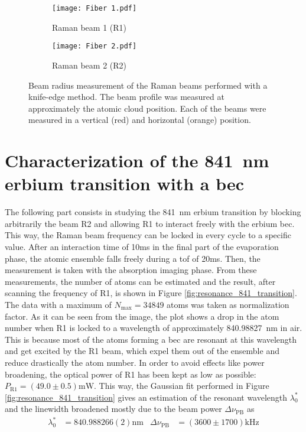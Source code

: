 \pagebreak

\begin{figure}
	\centering
	\begin{subfigure}{.5\textwidth}
		\centering
		\texttt{[image: Fiber 1.pdf]}
		\caption{Raman beam 1 (R1)}
		\label{fig:raman_beams_radius_1}
	\end{subfigure}%
	\begin{subfigure}{.5\textwidth}
		\centering
		\texttt{[image: Fiber 2.pdf]}
		\caption{Raman beam 2 (R2)}
		\label{fig:raman_beams_radius_2}
	\end{subfigure}
	\caption[Beam radius measurement of the Raman beams performed with a knife-edge method]{Beam radius measurement of the Raman beams performed with a knife-edge method. The beam profile was measured at approximately the atomic cloud position. Each of the beams were measured in a vertical (red) and horizontal (orange) position.}
	\label{fig:raman_beams_radius}
\end{figure}


\section{Characterization of the \SI{841}{\nano\meter} erbium transition with a \ac{bec}}

The following part consists in studying the \SI{841}{\nano\meter} erbium transition by blocking arbitrarily the beam R2 and allowing R1 to interact freely with the erbium \ac{bec}. This way, the Raman beam frequency can be locked in every cycle to a specific value. After an interaction time of 10\si{\milli\second} in the final part of the evaporation phase, the atomic ensemble falls freely during a \ac{tof} of 20\si{\milli\second}. Then, the measurement is taken with the absorption imaging phase. From these measurements, the number of atoms can be estimated and the result, after scanning the frequency of R1, is shown in Figure \ref{fig:resonance_841_transition}. The data with a maximum of $N_\text{max} = 34849$ atoms was taken as normalization factor. As it can be seen from the image, the plot shows a drop in the atom number when R1 is locked to a wavelength of approximately \SI{840.98827}{\nano\meter} in air. This is because most of the atoms forming a \ac{bec} are resonant at this wavelength and get excited by the R1 beam, which expel them out of the ensemble and reduce drastically the atom number. In order to avoid effects like power broadening, the optical power of R1 has been kept as low as possible: $P_{\text{R1}} = (49.0 \pm 0.5) \si{\milli\watt}$. This way, the Gaussian fit performed in Figure \ref{fig:resonance_841_transition} gives an estimation of the resonant wavelength $\lambda_0^*$ and the linewidth broadened mostly due to the beam power $\Delta\nu_{\text{PB}}$ as
\begin{align*}
	\lambda_0^* &= 840.988266(2)\si{\nano\meter}   &   \Delta\nu_{\text{PB}} &= (3600 \pm 1700)\si{\kilo\hertz}
\end{align*}

